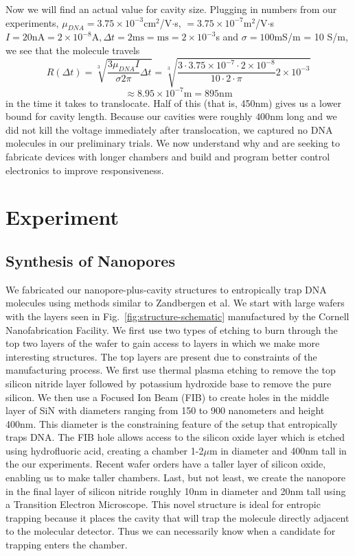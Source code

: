 \documentclass[aps,prl,preprint,groupedaddress]{revtex4}
\begin{document}
Now we will find an actual value for cavity size.
Plugging in numbers from our experiments, \(\mu_{DNA} = 3.75 \times 10^{-3}\)cm$^2$/V$\cdot$s, \( = 3.75 \times 10^{-7}\)m$^2$/V$\cdot$s \cite{mobility} \(I = 20 \mathrm{nA} = 2\times 10^{-8}\mathrm{A}, \Delta t = 2\mathrm{ms} = \mathrm{ms} = 2 \times 10^{-3}\)s and \(\sigma = 100\)mS/m = 10 S/m\cite{CRC}, we see that the molecule travels \[R(\Delta t) = \sqrt[3]{\frac{3 \mu_{DNA} I}{\sigma 2 \pi}\Delta t} = \sqrt[3]{\frac{3\cdot 3.75\times 10^{-7}\cdot 2\times10^{-8}}{10\cdot 2\cdot \pi} 2\times10^{-3}}\] \[\approx 8.95 \times 10^{-7}\mathrm{m} = 895 \mathrm{nm} \] in the time it takes to translocate.
Half of this (that is, 450nm) gives us a lower bound for cavity length.
Because our cavities were roughly \(400\)nm long and we did not kill the voltage immediately after translocation, we captured no DNA molecules in our preliminary trials.
We now understand why and are seeking to fabricate devices with longer chambers and build and program better control electronics to improve responsiveness.


\section{Experiment}

\subsection{Synthesis of Nanopores}

We fabricated our nanopore-plus-cavity structures to entropically trap DNA molecules using methods similar to Zandbergen et al.\cite{nanopore-fabrication}
We start with large wafers with the layers seen in Fig.~\ref{fig:structure-schematic} manufactured by the Cornell Nanofabrication Facility.
We first use two types of etching to burn through the top two layers of the wafer to gain access to layers in which we make more interesting structures.
The top layers are present due to constraints of the manufacturing process.
We first use thermal plasma etching to remove the top silicon nitride layer followed by potassium hydroxide base to remove the pure silicon.
We then use a Focused Ion Beam (FIB) to create holes in the middle layer of SiN with diameters ranging from 150 to 900 nanometers and height 400nm.
This diameter is the constraining feature of the setup that entropically traps DNA.
The FIB hole allows access to the silicon oxide layer which is etched using hydrofluoric acid, creating a chamber 1-2\(\mu\)m in diameter and 400nm tall in the our experiments.
Recent wafer orders have a taller layer of silicon oxide, enabling us to make taller chambers.
Last, but not least, we create the nanopore in the final layer of silicon nitride roughly 10nm in diameter and 20nm tall using a Transition Electron Microscope.
This novel structure is ideal for entropic trapping because it places the cavity that will trap the molecule directly adjacent to the molecular detector.
Thus we can necessarily know when a candidate for trapping enters the chamber.
\end{document}

